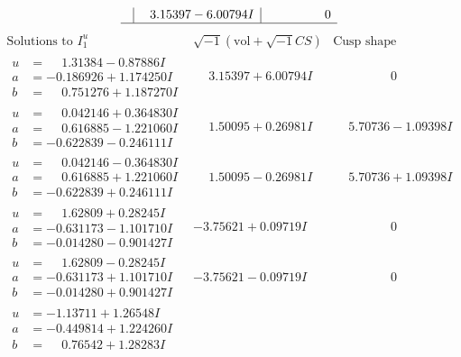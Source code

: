 \documentclass[1p]{elsarticle_modified}
\theoremstyle{definition}
\newcommand{\I}{\sqrt{-1}}
\begin{document}
$$\begin{array}{c|c|c}
 & \phantom{-}3.15397 - 6.00794 I & \phantom{-0.000000 } 0\\
 \hline 
 \end{array}$$\newpage$$\begin{array}{c|c|c}  
\text{Solutions to }I^u_{1}& \I (\text{vol} + \sqrt{-1}CS) & \text{Cusp shape}\\
 \hline 
\begin{aligned}
u &= \phantom{-}1.31384 - 0.87886 I \\
a &= -0.186926 + 1.174250 I \\
b &= \phantom{-}0.751276 + 1.187270 I\end{aligned}
 & \phantom{-}3.15397 + 6.00794 I & \phantom{-0.000000 } 0 \\ \hline\begin{aligned}
u &= \phantom{-}0.042146 + 0.364830 I \\
a &= \phantom{-}0.616885 - 1.221060 I \\
b &= -0.622839 - 0.246111 I\end{aligned}
 & \phantom{-}1.50095 + 0.26981 I & \phantom{-}5.70736 - 1.09398 I \\ \hline\begin{aligned}
u &= \phantom{-}0.042146 - 0.364830 I \\
a &= \phantom{-}0.616885 + 1.221060 I \\
b &= -0.622839 + 0.246111 I\end{aligned}
 & \phantom{-}1.50095 - 0.26981 I & \phantom{-}5.70736 + 1.09398 I \\ \hline\begin{aligned}
u &= \phantom{-}1.62809 + 0.28245 I \\
a &= -0.631173 - 1.101710 I \\
b &= -0.014280 - 0.901427 I\end{aligned}
 & -3.75621 + 0.09719 I & \phantom{-0.000000 } 0 \\ \hline\begin{aligned}
u &= \phantom{-}1.62809 - 0.28245 I \\
a &= -0.631173 + 1.101710 I \\
b &= -0.014280 + 0.901427 I\end{aligned}
 & -3.75621 - 0.09719 I & \phantom{-0.000000 } 0 \\ \hline\begin{aligned}
u &= -1.13711 + 1.26548 I \\
a &= -0.449814 + 1.224260 I \\
b &= \phantom{-}0.76542 + 1.28283 I\end{aligned}

\end{array}$$
\end{document}
